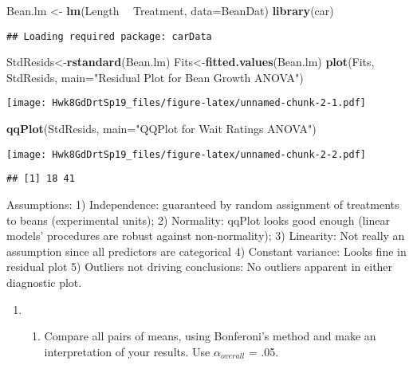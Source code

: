 \documentclass[]{article}
\newenvironment{Shaded}{\begin{snugshade}}{\end{snugshade}}
\newcommand{\KeywordTok}[1]{\textcolor[rgb]{0.13,0.29,0.53}{\textbf{#1}}}
\newcommand{\DataTypeTok}[1]{\textcolor[rgb]{0.13,0.29,0.53}{#1}}
\newcommand{\StringTok}[1]{\textcolor[rgb]{0.31,0.60,0.02}{#1}}
\newcommand{\OperatorTok}[1]{\textcolor[rgb]{0.81,0.36,0.00}{\textbf{#1}}}
\newcommand{\NormalTok}[1]{#1}
\providecommand{\tightlist}{%
  \setlength{\itemsep}{0pt}\setlength{\parskip}{0pt}}
\begin{document}
\begin{Shaded}
\begin{Highlighting}[]
\NormalTok{Bean.lm <-}\StringTok{ }\KeywordTok{lm}\NormalTok{(Length }\OperatorTok{~}\StringTok{ }\NormalTok{Treatment, }\DataTypeTok{data=}\NormalTok{BeanDat)}
\KeywordTok{library}\NormalTok{(car)}
\end{Highlighting}
\end{Shaded}

\begin{verbatim}
## Loading required package: carData
\end{verbatim}

\begin{Shaded}
\begin{Highlighting}[]
\NormalTok{StdResids<-}\KeywordTok{rstandard}\NormalTok{(Bean.lm) }
\NormalTok{Fits<-}\KeywordTok{fitted.values}\NormalTok{(Bean.lm)}
\KeywordTok{plot}\NormalTok{(Fits, StdResids, }\DataTypeTok{main=}\StringTok{"Residual Plot for Bean Growth ANOVA"}\NormalTok{)}
\end{Highlighting}
\end{Shaded}

\texttt{[image: Hwk8GdDrtSp19\_files/figure-latex/unnamed-chunk-2-1.pdf]}

\begin{Shaded}
\begin{Highlighting}[]
\KeywordTok{qqPlot}\NormalTok{(StdResids, }\DataTypeTok{main=}\StringTok{"QQPlot for Wait Ratings ANOVA"}\NormalTok{)}
\end{Highlighting}
\end{Shaded}

\texttt{[image: Hwk8GdDrtSp19\_files/figure-latex/unnamed-chunk-2-2.pdf]}

\begin{verbatim}
## [1] 18 41
\end{verbatim}

Assumptions: 1) Independence: guaranteed by random assignment of
treatments to beans (experimental units); 2) Normality: qqPlot looks
good enough (linear models' procedures are robust against
non-normality); 3) Linearity: Not really an assumption since all
predictors are categorical 4) Constant variance: Looks fine in residual
plot 5) Outliers not driving conclusions: No outliers apparent in either
diagnostic plot.

\begin{enumerate}
\def\labelenumi{\Alph{enumi})}
\setcounter{enumi}{3}
\item
  \begin{enumerate}
  \def\labelenumii{\roman{enumii})}
  \tightlist
  \item
    Compare all pairs of means, using Bonferoni's method and make an
    interpretation of your results. Use \(\alpha_{overall}\) = .05.
  \end{enumerate}
\end{enumerate}
\end{document}
